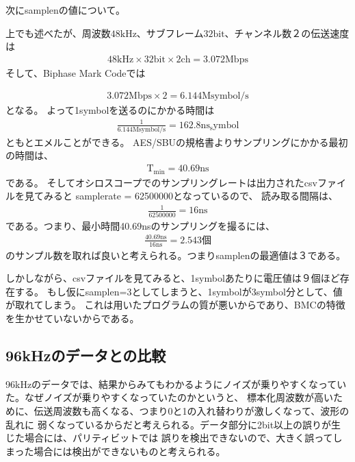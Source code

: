 \documentclass[11pt,a4j]{jsarticle}
\begin{document}
次にsamplenの値について。

上でも述べたが、周波数$48 \mathrm{kHz}$、サブフレーム$32\mathrm{bit}$、チャンネル数２の伝送速度は
\begin{align*}
  48 \mathrm{kHz} \times 32 \mathrm{bit} \times 2 \mathrm{ch} = 3.072 \mathrm{Mbps}
\end{align*}
そして、Biphase Mark Codeでは

\begin{align*}
	3.072 \mathrm{Mbps} \times 2 = 6.144 \mathrm{Msymbol/s}
\end{align*}
となる。
よって1symbolを送るのにかかる時間は
\begin{align*}
  \frac{1}{6.144\mathrm{Msymbol/s}} = 162.8 \mathrm{ns_symbol}
\end{align*}
ともとエメルことができる。
AES/SBUの規格書よりサンプリングにかかる最初の時間は、
\begin{align*}
  \mathrm{T_{min}} = 40.69 \mathrm{ns}
\end{align*}
である。
そしてオシロスコープでのサンプリングレートは出力されたcsvファイルを見てみると
samplerate = 62500000となっているので、
読み取る間隔は、
\begin{align*}
  \frac{1}{62500000} = 16\mathrm{ns}
\end{align*}
である。つまり、最小時間40.69nsのサンプリングを撮るには、
\begin{align*}
  \frac{40.69\mathrm{ns}}{16\mathrm{ns}} = 2.543個
\end{align*}
のサンプル数を取れば良いと考えられる。つまりsamplenの最適値は３である。

しかしながら、csvファイルを見てみると、1symbolあたりに電圧値は９個ほど存在する。
もし仮にsamplen=3としてしまうと、1symbolが3symbol分として、値が取れてしまう。
これは用いたプログラムの質が悪いからであり、BMCの特徴を生かせていないからである。


\subsection{96kHzのデータとの比較}
\label{sub:96kHzのデータとの比較}

96kHzのデータでは、結果からみてもわかるようにノイズが乗りやすくなっていた。なぜノイズが乗りやすくなっていたのかというと、
標本化周波数が高いために、伝送周波数も高くなる、つまり0と1の入れ替わりが激しくなって、波形の乱れに
弱くなっているからだと考えられる。データ部分に2bit以上の誤りが生じた場合には、パリティビットでは
誤りを検出できないので、大きく誤ってしまった場合には検出ができないものと考えられる。
\end{document}

